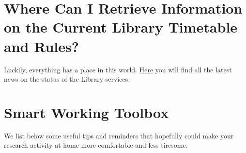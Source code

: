 \documentclass{sissavademecum}
\begin{document}
\section{Where Can I Retrieve Information on the Current Library Timetable and Rules?}

Luckily, everything has a place in this world. \href{https://library.sissa.it/new-library-timetable-rules}{Here} you will find all the latest news on the status of the Library services.


\section{Smart Working Toolbox}

We list below some useful tips and reminders that hopefully could make your research activity at home more comfortable and less tiresome.
\end{document}
